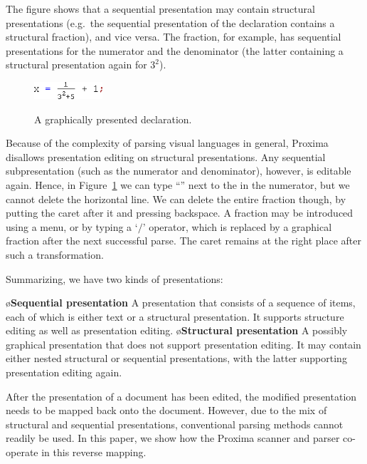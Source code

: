 \documentclass{article}[10pt]
\begin{document}
The figure shows that a sequential presentation may contain structural presentations (e.g.\ the sequential presentation of the declaration contains a structural fraction), and vice versa. The fraction, for example, has sequential presentations for the numerator and the denominator (the latter containing a structural presentation again for $3^2$).


\begin{figure}
\begin{center}
\includegraphics[width=1in]{images/scanFrac}\
\end{center}
\caption{A graphically presented declaration.} \label{fig:graphicalDecl} 
\end{figure}




Because of the complexity of parsing visual languages in general, Proxima disallows presentation editing on structural presentations. Any sequential subpresentation (such as the numerator and denominator), however, is editable again. Hence, in Figure~\ref{fig:graphicalDecl} we can type ``'' next to the  in the numerator, but we cannot delete the horizontal line. We can delete the entire fraction though, by putting the caret after it and pressing backspace. A fraction may be introduced using a menu, or by typing a `$/$' operator, which is replaced by a graphical fraction after the next successful parse. The caret remains at the right place after such a transformation.

Summarizing, we have two kinds of presentations:

\bl
\o {\bf Sequential presentation} A presentation that consists of a sequence of items, each of which is either text or a structural presentation. It supports structure editing as well as presentation editing.
\o {\bf Structural presentation} A possibly graphical presentation that does not support presentation editing. It may contain either nested structural or sequential presentations, with the latter supporting presentation editing again.
\el


After the presentation of a document has been edited, the modified presentation needs to be mapped back onto the document. However, due to the mix of structural and sequential presentations, conventional parsing methods cannot readily be used. In this paper, we show how the Proxima scanner and parser co-operate in this reverse mapping. 
\end{document}
